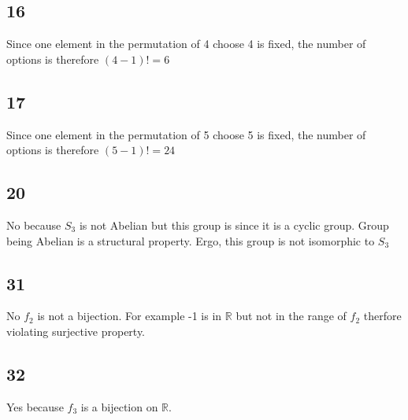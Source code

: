 \documentclass{article}
\begin{document}
\subsection*{16}
Since one element in the permutation of 4 choose 4 is fixed, the number of
options is therefore $(4-1)! = 6$

\subsection*{17}
Since one element in the permutation of 5 choose 5 is fixed, the number of
options is therefore $(5-1)! = 24$

\subsection*{20}
No because $S_3$ is not Abelian but this group is since it is a cyclic group.
Group being Abelian is a structural property. Ergo, this group is not
isomorphic to $S_3$

\subsection*{31}
No $f_2$ is not a bijection. For example -1 is in $\mathbb{R}$ but not in the
range of $f_2$ therfore violating surjective property.
\subsection*{32}
Yes because $f_3$ is a bijection on $\mathbb{R}$.
\end{document}
